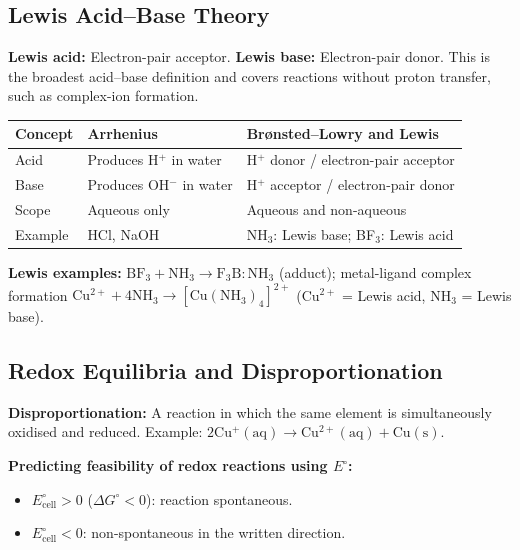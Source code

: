 \documentclass[12pt,a4paper]{article}
\begin{document}
\subsection{Lewis Acid--Base Theory}
\begin{tcolorbox}[defbox]
\textbf{Lewis acid:} Electron-pair acceptor. \textbf{Lewis base:} Electron-pair donor. This is the broadest acid--base definition and covers reactions without proton transfer, such as complex-ion formation.
\end{tcolorbox}

\begin{tabularx}{\linewidth}{|B{2.4cm}|Y|Y|}
\hline
\textbf{Concept} & \textbf{Arrhenius} & \textbf{Brønsted--Lowry} and \textbf{Lewis} \\
\hline
Acid & Produces H$^+$ in water & H$^+$ donor / electron-pair acceptor \\
\hline
Base & Produces OH$^-$ in water & H$^+$ acceptor / electron-pair donor \\
\hline
Scope & Aqueous only & Aqueous and non-aqueous \\
\hline
Example & HCl, NaOH & NH$_3$: Lewis base; BF$_3$: Lewis acid \\
\hline
\end{tabularx}

\textbf{Lewis examples:} $\mathrm{BF_3 + NH_3 \to F_3B{:}NH_3}$ (adduct); metal-ligand complex formation $\mathrm{Cu^{2+} + 4NH_3 \to [Cu(NH_3)_4]^{2+}}$ (Cu$^{2+}$ = Lewis acid, NH$_3$ = Lewis base).

\subsection{Redox Equilibria and Disproportionation}
\begin{tcolorbox}[defbox]
\textbf{Disproportionation:} A reaction in which the same element is simultaneously oxidised and reduced. Example: $\mathrm{2Cu^+(aq) \to Cu^{2+}(aq) + Cu(s)}$.
\end{tcolorbox}

\textbf{Predicting feasibility of redox reactions using $E^\circ$:}
\begin{itemize}[leftmargin=*, itemsep=1pt, topsep=2pt]
  \item $E^\circ_{\mathrm{cell}} > 0$ ($\Delta G^\circ < 0$): reaction spontaneous.
  \item $E^\circ_{\mathrm{cell}} < 0$: non-spontaneous in the written direction.
\end{itemize}
\end{document}
